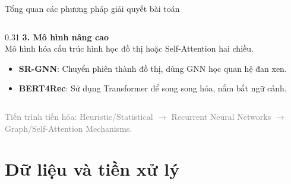\documentclass[aspectratio=169, 11pt]{beamer}
\begin{document}
\begin{frame}{Tổng quan các phương pháp giải quyết bài toán}
\begin{columns}[t]
        \begin{column}{0.31\textwidth}
            \small
            \textbf{3. Mô hình nâng cao}\\
            \vspace{0.5cm}
            \footnotesize
            Mô hình hóa cấu trúc hình học đồ thị hoặc Self-Attention hai chiều.\\
            \vspace{0.25cm}
            \begin{itemize}
                \item \textbf{SR-GNN}: Chuyển phiên thành đồ thị, dùng GNN học quan hệ đan xen.
                \item \textbf{BERT4Rec}: Sử dụng Transformer để song song hóa, nắm bắt ngữ cảnh.
            \end{itemize}
        \end{column}
    \end{columns}

    \vspace{0.45cm}
    \begin{center}
        \begin{minipage}{0.95\textwidth}
            \centering
            \tiny \textcolor{gray}{Tiến trình tiến hóa: Heuristic/Statistical $\longrightarrow$ Recurrent Neural Networks $\longrightarrow$ Graph/Self-Attention Mechanisms.}
        \end{minipage}
    \end{center}
\end{frame}

\section{Dữ liệu và tiền xử lý}
\end{document}
